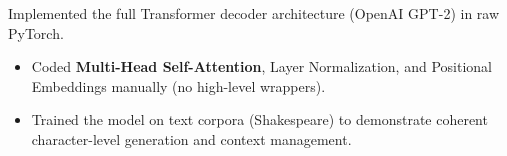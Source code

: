 Implemented the full Transformer decoder architecture (OpenAI GPT-2) in raw PyTorch.
\begin{itemize}
\item Coded \textbf{Multi-Head Self-Attention}, Layer Normalization, and Positional Embeddings manually (no high-level wrappers).
\item Trained the model on text corpora (Shakespeare) to demonstrate coherent character-level generation and context management.
\end{itemize}
{\LaTeXraggedright
{}
\par}